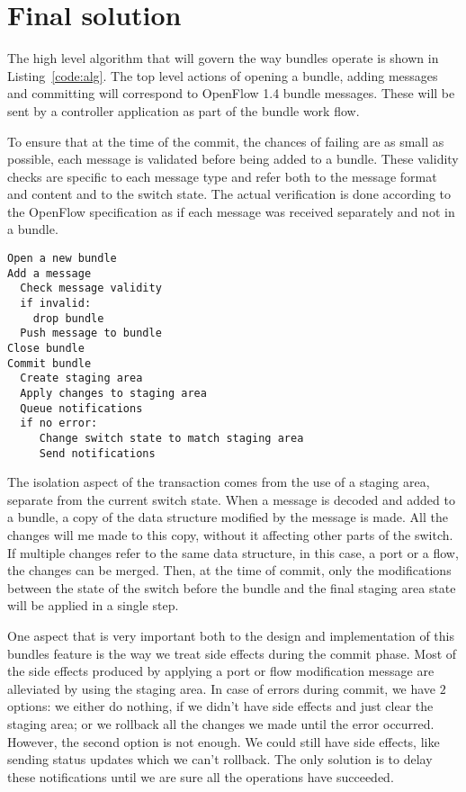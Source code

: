 \section{Final solution}

The high level algorithm that will govern the way bundles operate is shown in Listing~\ref{code:alg}. The top
level actions of opening a bundle, adding messages and committing will correspond to OpenFlow 1.4 bundle messages.
These will be sent by a controller application as part of the bundle work flow.

To ensure that at the time of the commit, the chances of failing are as small as possible, each message
is validated before being added to a bundle. These validity checks are specific to each message type and refer
both to the message format and content and to the switch state. The actual verification is done according to
the OpenFlow specification as if each message was received separately and not in a bundle.

\begin{lstlisting}[caption={Basic Commit Algorithm}, label=code:alg]
Open a new bundle
Add a message
  Check message validity
  if invalid:
    drop bundle
  Push message to bundle
Close bundle
Commit bundle
  Create staging area
  Apply changes to staging area
  Queue notifications
  if no error:
     Change switch state to match staging area
     Send notifications
\end{lstlisting}

The isolation aspect of the transaction comes from the use of a staging area, separate from the current switch state.
When a message is decoded and added to a bundle, a copy of the data structure modified by the message is made.
All the changes will me made to this copy, without it affecting other parts of the switch. If multiple changes refer to
the same data structure, in this case, a port or a flow, the changes can be merged. Then, at the time of commit, only
the modifications between the state of the switch before the bundle and the final staging area state will be applied
in a single step.

One aspect that is very important both to the design and implementation of this bundles feature is the way we
treat side effects during the commit phase. Most of the side effects produced by applying a port or flow modification
message are alleviated by using the staging area. In case of errors during commit, we have $2$ options: we either do
nothing, if we didn't have side effects and just clear the staging area; or we rollback all the changes we made until
the error occurred. However, the second option is not enough. We could still have side effects, like sending status updates
which we can't rollback. The only solution is to delay these notifications until we are sure all the operations have
succeeded.




